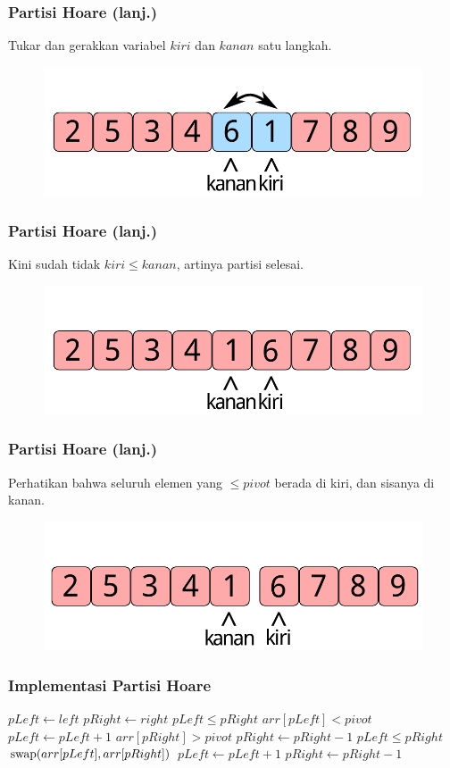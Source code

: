 \begin{frame}
\frametitle{Partisi Hoare (lanj.)}
Tukar dan gerakkan variabel $kiri$ dan $kanan$ satu langkah.
\begin{figure}
  \centering
  \includegraphics[width=7 cm]{asset/partition-8.pdf}
\end{figure}
\end{frame}

\begin{frame}
\frametitle{Partisi Hoare (lanj.)}
Kini sudah tidak $kiri \leq kanan$, artinya partisi selesai.
\begin{figure}
  \centering
  \includegraphics[width=7 cm]{asset/partition-9.pdf}
\end{figure}
\end{frame}

\begin{frame}
\frametitle{Partisi Hoare (lanj.)}
Perhatikan bahwa seluruh elemen yang $\leq pivot$ berada di kiri, dan sisanya di kanan.
\begin{figure}
  \centering
  \includegraphics[width=7 cm]{asset/partition-10.pdf}
\end{figure}
\end{frame}

\begin{frame}
\frametitle{Implementasi Partisi Hoare }
\begin{codebox}
\li $pLeft \gets left$
\li $pRight \gets right$
\li \While $pLeft \leq pRight$ \Do
\li   \While $arr[pLeft] < pivot$ \Do
\li     $pLeft \gets pLeft + 1$
      \End
\li   \While $arr[pRight] > pivot$ \Do
\li     $pRight \gets pRight - 1$
      \End
\li   \If $pLeft \leq pRight$ \Then
\li     $\func{swap}(arr[pLeft], arr[pRight])$
\li     $pLeft \gets pLeft + 1$
\li     $pRight \gets pRight - 1$
      \End      
    \End
\end{codebox}
\end{frame}

